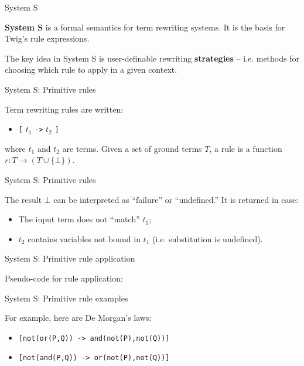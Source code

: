 \documentclass{beamer}
\begin{document}
\begin{frame}{System S}

\textbf{System S} is a formal semantics for term rewriting systems. It is the
basis for Twig's rule expressions.

The key idea in System S is user-definable rewriting \textbf{strategies} --
i.e. methods for choosing which rule to apply in a given context.

\end{frame}


\begin{frame}{System S: Primitive rules}

Term rewriting rules are written:

\begin{itemize}
  \item \texttt{[} $t_1$ \texttt{->} $t_2$ \texttt{]}
\end{itemize}

where $t_1$ and $t_2$ are terms. Given a set of ground terms $T$, a rule is a
function $r : T \to (T \cup \{\bot\})$.

\end{frame}


\begin{frame}{System S: Primitive rules}

The result $\bot$ can be interpreted as ``failure'' or ``undefined.'' It is
returned in case:

\begin{itemize}
  \item The input term does not ``match'' $t_1$;
  \item $t_2$ contains variables not bound in $t_1$ (i.e. substitution is undefined).
\end{itemize}

\end{frame}


\begin{frame}{System S: Primitive rule application}

Pseudo-code for rule application:



\end{frame}


\begin{frame}{System S: Primitive rule examples}

For example, here are De Morgan's laws:

\begin{itemize}
  \item \texttt{[not(or(P,Q)) -> and(not(P),not(Q))]}
  \item \texttt{[not(and(P,Q)) -> or(not(P),not(Q))]}
\end{itemize}

\end{frame}
\end{document}
